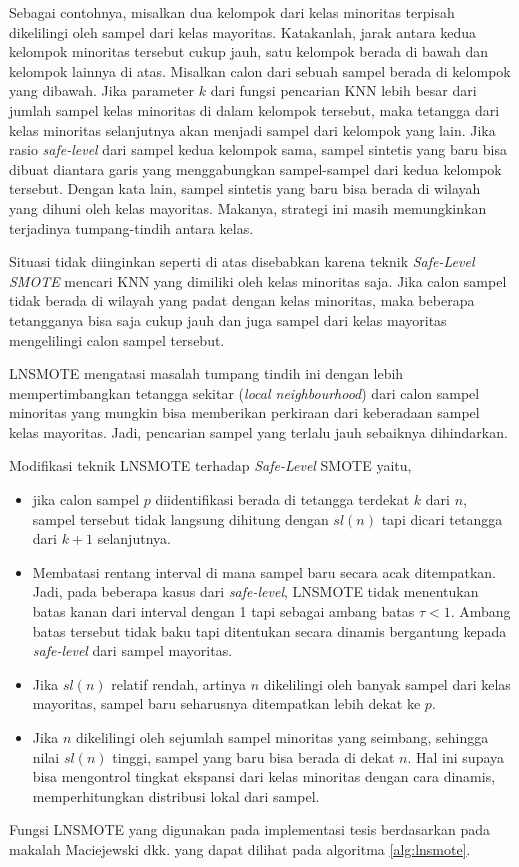 Sebagai contohnya, misalkan dua kelompok dari kelas minoritas terpisah
dikelilingi oleh sampel dari kelas mayoritas.
Katakanlah, jarak antara kedua kelompok minoritas tersebut cukup jauh, satu
kelompok berada di bawah dan kelompok lainnya di atas.
Misalkan calon dari sebuah sampel berada di kelompok yang dibawah.
Jika parameter $ k $ dari fungsi pencarian KNN lebih besar dari jumlah sampel
kelas minoritas di dalam kelompok tersebut, maka tetangga dari kelas minoritas
selanjutnya akan menjadi sampel dari kelompok yang lain.
Jika rasio \textit{safe-level} dari sampel kedua kelompok sama, sampel sintetis
yang baru bisa dibuat diantara garis yang menggabungkan sampel-sampel dari
kedua kelompok tersebut.
Dengan kata lain, sampel sintetis yang baru bisa berada di wilayah yang dihuni
oleh kelas mayoritas.
Makanya, strategi ini masih memungkinkan terjadinya tumpang-tindih antara
kelas.

Situasi tidak diinginkan seperti di atas disebabkan karena teknik
\textit{Safe-Level SMOTE} mencari KNN yang dimiliki oleh kelas minoritas saja.
Jika calon sampel tidak berada di wilayah yang padat dengan kelas minoritas,
maka beberapa tetangganya bisa saja cukup jauh dan juga sampel dari kelas
mayoritas mengelilingi calon sampel tersebut.

LNSMOTE mengatasi masalah tumpang tindih ini dengan lebih mempertimbangkan
tetangga sekitar
(\textit{local neighbourhood})
dari calon sampel minoritas yang mungkin bisa memberikan perkiraan dari
keberadaan sampel kelas mayoritas.
Jadi, pencarian sampel yang terlalu jauh sebaiknya dihindarkan.

Modifikasi teknik LNSMOTE terhadap \textit{Safe-Level} SMOTE yaitu,
\begin{itemize}
\item jika calon sampel $ p $ diidentifikasi berada di tetangga terdekat $ k
$ dari $ n $, sampel tersebut tidak langsung dihitung dengan $ sl(n) $ tapi
dicari tetangga dari $ k + 1 $ selanjutnya.
\item Membatasi rentang interval di mana sampel baru secara acak ditempatkan.
Jadi, pada beberapa kasus dari \textit{safe-level}, LNSMOTE tidak menentukan
batas kanan dari interval dengan 1 tapi sebagai ambang batas $\tau < 1$.
Ambang batas tersebut tidak baku tapi ditentukan secara dinamis bergantung
kepada \textit{safe-level} dari sampel mayoritas.
\item Jika $ sl(n) $ relatif rendah, artinya $ n $ dikelilingi oleh banyak
sampel dari kelas mayoritas, sampel baru seharusnya ditempatkan lebih dekat ke
$ p $.
\item Jika $ n $ dikelilingi oleh sejumlah sampel minoritas yang seimbang,
sehingga nilai $ sl(n) $ tinggi, sampel yang baru bisa berada di dekat $ n $.
Hal ini supaya bisa mengontrol tingkat ekspansi dari kelas minoritas dengan
cara dinamis, memperhitungkan distribusi lokal dari sampel.
\end{itemize}

Fungsi LNSMOTE yang digunakan pada implementasi tesis berdasarkan pada
makalah Maciejewski dkk.
\cite{maciejewski2011local}
yang dapat dilihat pada algoritma
\ref{alg:lnsmote}.
